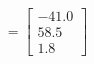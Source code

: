 \documentclass[preview]{standalone}
\begin{document}
\begin{align*}
=\begin{bmatrix} -41.0 \\ 58.5 \\ 1.8 \end{bmatrix}
\end{align*}
\end{document}
